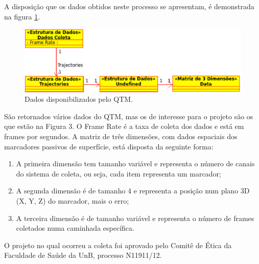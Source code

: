 A disposição que os dados obtidos neste processo se apresentam, é demonstrada na figura \ref{dados_coleta}.

\begin{figure}[ht]
	\centering
	\includegraphics[width=15cm]{figuras/dados_coleta.eps}
	\caption{Dados disponibilizados pelo QTM.}
	\label{dados_coleta}
\end{figure}

São retornados vários dados do QTM, mas os de interesse para o projeto são os que estão na Figura 3. 
O Frame Rate é a taxa de coleta dos dados e está em frames por segundos. 
A matriz de três dimensões, com dados espaciais dos marcadores passivos de superfície, está disposta da seguinte forma:
\begin{enumerate}
	\item A primeira dimensão tem tamanho variável e representa o número de canais do sistema de coleta, ou seja, cada item representa um marcador;
	\item A segunda dimensão é de tamanho 4 e representa a posição num plano 3D (X, Y, Z) do marcador, mais o erro;
	\item A terceira dimensão é de tamanho variável e representa o número de frames coletados numa caminhada específica.
\end{enumerate}

O projeto no qual ocorreu a coleta foi aprovado
pelo Comitê de Ética da Faculdade de Saúde da UnB,
processo N11911/12.
